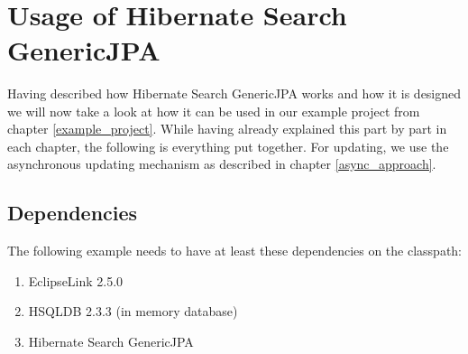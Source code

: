 \pagebreak
~
\pagebreak

\section{Usage of Hibernate Search GenericJPA} \label{usage_chapter}

Having described how Hibernate Search GenericJPA works and how it is designed we will now take a look at how it can be used in our example project from chapter \ref{example_project}. While having already explained this part by part in each chapter, the following is everything put together. For updating, we use the asynchronous updating mechanism as described in chapter \ref{async_approach}.

\subsection{Dependencies}

The following example needs to have at least these dependencies on the classpath:

\begin{enumerate}
	\item{EclipseLink 2.5.0}
	\item{HSQLDB 2.3.3 (in memory database)}
	\item{Hibernate Search GenericJPA}
\end{enumerate}

\pagebreak

